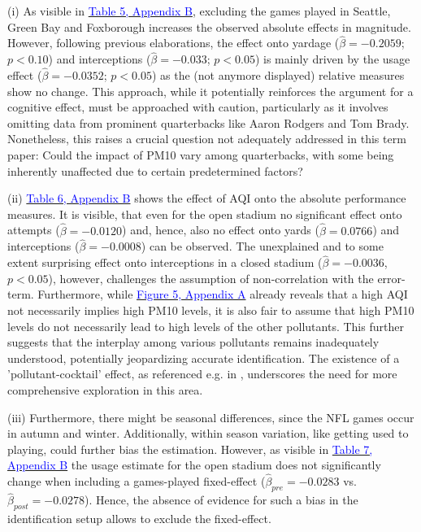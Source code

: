 \documentclass[12pt,a4paper]{article}
\newcommand{\mylink}[2]{\hyperref[#1]{\textcolor{blue}{#2}}}
\begin{document}
{(i) As visible in \mylink{A:T2}{Table 5, Appendix B}, excluding the games played in Seattle, Green Bay and Foxborough increases the observed absolute effects in magnitude. However, following previous elaborations, the effect onto yardage ($\hat{\beta} = -0.2059$; $p < 0.10$) and interceptions ($\hat{\beta} = -0.033$; $p < 0.05$) is mainly driven by the usage effect ($\hat{\beta} = -0.0352$; $p < 0.05$) as the (not anymore displayed) relative measures show no change. This approach, while it potentially reinforces the argument for a cognitive effect, must be approached with caution, particularly as it involves omitting data from prominent quarterbacks like Aaron Rodgers and Tom Brady. Nonetheless, this raises a crucial question not adequately addressed in this term paper: Could the impact of PM10 vary among quarterbacks, with some being inherently unaffected due to certain predetermined factors?


(ii) \mylink{A:T2}{Table 6, Appendix B} shows the effect of AQI onto the absolute performance measures. It is visible, that even for the open stadium no significant effect onto attempts ($\hat{\beta} = -0.0120$) and, hence, also no effect onto yards ($\hat{\beta} = 0.0766$) and interceptions ($\hat{\beta} = -0.0008$) can be observed. The unexplained and to some extent surprising effect onto interceptions in a closed stadium ($\hat{\beta} = -0.0036$, $p < 0.05$), however, challenges the assumption of non-correlation with the error-term.
Furthermore, while \mylink{AppF:4}{Figure 5, Appendix A} already reveals that a high AQI not necessarily implies high PM10 levels, it is also fair to assume that high PM10 levels do not necessarily lead to high levels of the other pollutants. This further suggests that the interplay among various pollutants remains inadequately understood, potentially jeopardizing accurate identification. The existence of a 'pollutant-cocktail' effect, as referenced e.g. in \citet{schlenker2016}, underscores the need for more comprehensive exploration in this area.

(iii) Furthermore, there might be seasonal differences, since the NFL games occur in autumn and winter. Additionally, within season variation, like getting used to playing, could further bias the estimation. However, as visible in \mylink{A:T3}{Table 7, Appendix B} the usage estimate for the open stadium does not significantly change when including a games-played fixed-effect ($\hat{\beta}_{pre} = -0.0283$ vs. $\hat{\beta}_{post} = -0.0278$). Hence, the absence of evidence for such a bias in the identification setup allows to exclude the fixed-effect. 

}
\end{document}
